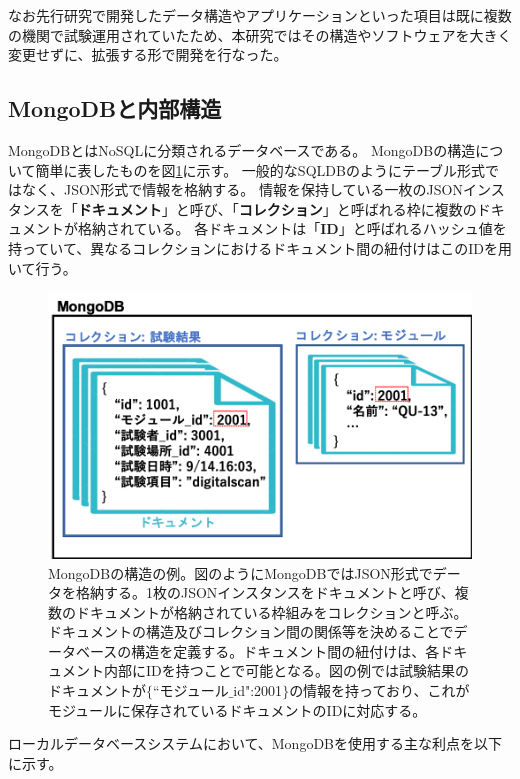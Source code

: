 なお先行研究で開発したデータ構造やアプリケーションといった項目は既に複数の機関で試験運用されていたため、本研究ではその構造やソフトウェアを大きく変更せずに、拡張する形で開発を行なった。

\clearpage
\subsection{MongoDBと内部構造\cite{4-2}}
MongoDBとはNoSQLに分類されるデータベースである。
MongoDBの構造について簡単に表したものを図\ref{mongodb_schema}に示す。
一般的なSQLDBのようにテーブル形式ではなく、JSON形式で情報を格納する。
情報を保持している一枚のJSONインスタンスを「\textbf{ドキュメント}」と呼び、「\textbf{コレクション}」と呼ばれる枠に複数のドキュメントが格納されている。
各ドキュメントは「\textbf{ID}」と呼ばれるハッシュ値を持っていて、異なるコレクションにおけるドキュメント間の紐付けはこのIDを用いて行う。

\begin{figure}[bpt]\centering
\includegraphics[width=12cm]{./mongodb_schema.png}
\caption[MongoDBの構造の例]{MongoDBの構造の例。図のようにMongoDBではJSON形式でデータを格納する。1枚のJSONインスタンスをドキュメントと呼び、複数のドキュメントが格納されている枠組みをコレクションと呼ぶ。ドキュメントの構造及びコレクション間の関係等を決めることでデータベースの構造を定義する。ドキュメント間の紐付けは、各ドキュメント内部にIDを持つことで可能となる。図の例では試験結果のドキュメントが$\{$``モジュール$\_$id":2001$\}$の情報を持っており、これがモジュールに保存されているドキュメントのIDに対応する。}
\label{mongodb_schema}
\end{figure}


ローカルデータベースシステムにおいて、MongoDBを使用する主な利点を以下に示す。

